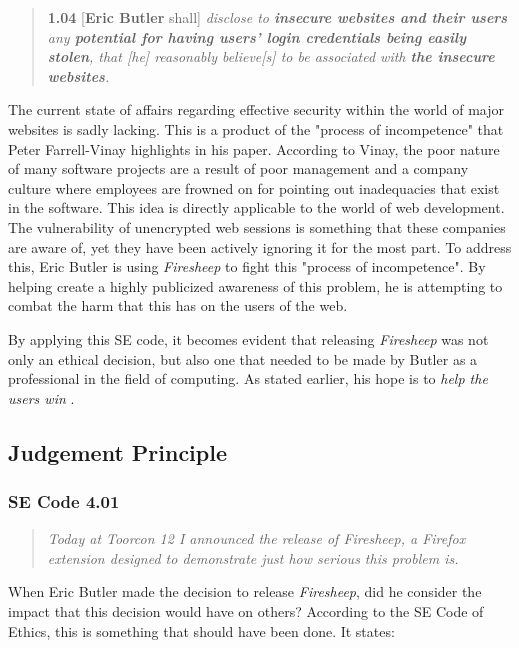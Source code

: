 \documentclass[11pt]{article}
\begin{document}
\begin{multicols}{2}
\begin{quote}
  \textbf{1.04} [\textbf{Eric Butler} shall] \emph{disclose to \textbf{insecure websites and their users} any \textbf{potential for having users' login credentials being easily stolen}, that [he] reasonably believe[s] to be associated with \textbf{the insecure websites}.}
\end{quote}

The current state of affairs regarding effective security within the world of major websites is sadly lacking. This is a product of the "process of incompetence" that Peter Farrell-Vinay \cite{incompetence} highlights in his paper. According to Vinay, the poor nature of many software projects are a result of poor management and a company culture where employees are frowned on for pointing out inadequacies that exist in the software. This idea is directly applicable to the world of web development. The vulnerability of unencrypted web sessions is something that these companies are aware of, yet they have been actively ignoring it for the most part. To address this, Eric Butler is using \emph{Firesheep} to fight this "process of incompetence". By helping create a highly publicized awareness of this problem, he is attempting to combat the harm that this has on the users of the web.

By applying this SE code, it becomes evident that releasing \emph{Firesheep} was not only an ethical decision, but also one that needed to be made by Butler as a professional in the field of computing. As stated earlier, his hope is to \emph{help the users win} \cite{codebutler_main}.
\subsection{Judgement Principle}
\subsubsection{SE Code 4.01}
\begin{quote}
  \emph{Today at Toorcon 12 I announced the release of Firesheep, a Firefox extension designed to demonstrate just how serious this problem is.} \cite{codebutler_main}
\end{quote}

When Eric Butler made the decision to release \emph{Firesheep}, did he consider the impact that this decision would have on others? According to the SE Code of Ethics, this is something that should have been done. It states:



\end{multicols}
\end{document}
